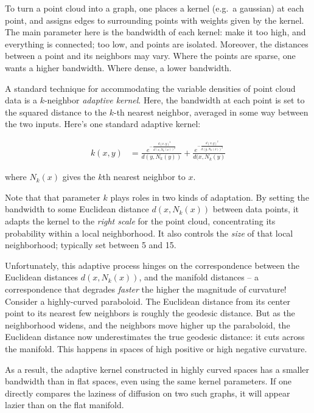 \documentclass[
  letterpaper,
  DIV=11,
  numbers=noendperiod]{scrartcl}
\theoremstyle{plain}
\theoremstyle{plain}
\theoremstyle{definition}
\theoremstyle{plain}
\theoremstyle{definition}
\theoremstyle{remark}
\begin{document}
To turn a point cloud into a graph, one places a kernel (e.g.~a
gaussian) at each point, and assigns edges to surrounding points with
weights given by the kernel. The main parameter here is the bandwidth of
each kernel: make it too high, and everything is connected; too low, and
points are isolated. Moreover, the distances between a point and its
neighbors may vary. Where the points are sparse, one wants a higher
bandwidth. Where dense, a lower bandwidth.

A standard technique for accommodating the variable densities of point
cloud data is a \(k\)-neighbor \emph{adaptive kernel}. Here, the
bandwidth at each point is set to the squared distance to the \(k\)-th
nearest neighbor, averaged in some way between the two inputs. Here's
one standard adaptive kernel:

\[
\begin{aligned}
k(x, y) & =\frac{e^{-\frac{d(x, y)^2}{d(x, N_{k}(x))^2}}}{d(y, N_{k}(y))}
+\frac{e^{-\frac{d(x, y)^2}{d(y, N_{k}(x))^2}}}{d(x, N_{k}(y)}
\end{aligned}
\]

where \(N_{k}(x)\) gives the \(k\)th nearest neighbor to \(x\).

Note that that parameter \(k\) plays roles in two kinds of adaptation.
By setting the bandwidth to some Euclidean distance \(d(x,N_{k}(x))\)
between data points, it adapts the kernel to the \emph{right scale} for
the point cloud, concentrating its probability within a local
neighborhood. It also controls the \emph{size} of that local
neighborhood; typically set between 5 and 15.

Unfortunately, this adaptive process hinges on the correspondence
between the Euclidean distances \(d(x,N_{k}(x))\), and the manifold
distances -- a correspondence that degrades \emph{faster} the higher the
magnitude of curvature! Consider a highly-curved paraboloid. The
Euclidean distance from its center point to its nearest few neighbors is
roughly the geodesic distance. But as the neighborhood widens, and the
neighbors move higher up the paraboloid, the Euclidean distance now
underestimates the true geodesic distance: it cuts across the manifold.
This happens in spaces of high positive or high negative curvature.

As a result, the adaptive kernel constructed in highly curved spaces has
a smaller bandwidth than in flat spaces, even using the same kernel
parameters. If one directly compares the laziness of diffusion on two
such graphs, it will appear lazier than on the flat manifold.
\end{document}

